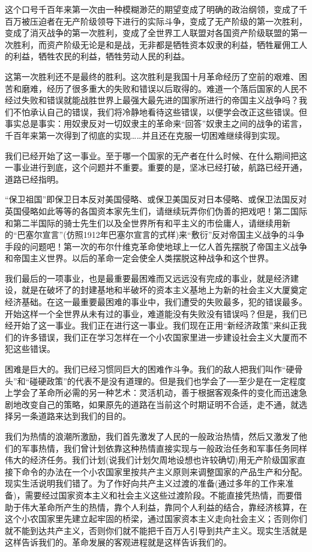 \documentclass[UTF8, 12pt, a4paper]{ctexrep}
\begin{document}
这个口号千百年来第一次由一种模糊渺茫的期望变成了明确的政治纲领，变成了千百万被压迫者在无产阶级领导下进行的实际斗争，变成了无产阶级的第一次胜利，变成了消灭战争的第一次胜利，变成了全世界工人联盟对各国资产阶级联盟的第一次胜利，而资产阶级无论是和是战，无非都是牺牲资本奴隶的利益，牺牲雇佣工人的利益，牺牲农民的利益，牺牲劳动人民的利益。

这第一次胜利还不是最终的胜利。这次胜利是我国十月革命经历了空前的艰难、困苦和磨难，经历了很多重大的失败和错误以后取得的。难道一个落后国家的人民不经过失败和错误就能战胜世界上最强大最先进的国家所进行的帝国主义战争吗？我们不怕承认自己的错误，我们将冷静地看待这些错误，以便学会改正这些错误。但事实总是事实：用奴隶反对一切奴隶主的革命来“回答”奴隶主之间的战争的诺言，千百年来第一次得到了彻底的实现……并且还在克服一切困难继续得到实现。

我们已经开始了这一事业。至于哪一个国家的无产者在什么时候、在什么期间把这一事业进行到底，这个问题并不重要。重要的是，坚冰已经打破，航路已经开通，道路已经指明。

“保卫祖国”即保卫日本反对美国侵略、或保卫美国反对日本侵略、或保卫法国反对英国侵略如此等等的各国资本家先生们，请继续玩弄你们伪善的把戏吧！第二国际和第二半国际的骑士先生们以及全世界所有和平主义的市侩庸人，请继续用新的“巴塞尔宣言”(仿照1912年巴塞尔宣言的式样)来“敷衍”反对帝国主义战争的斗争手段的问题吧！第一次的布尔什维克革命使地球上一亿人首先摆脱了帝国主义战争和帝国主义世界。以后的革命一定会使全人类摆脱这种战争和这个世界。

我们最后的一项事业，也是最重要最困难而又远远没有完成的事业，就是经济建设，就是在破坏了的封建基地和半破坏的资本主义基地上为新的社会主义大厦奠定经济基础。在这一最重要最困难的事业中，我们遭受的失败最多，犯的错误最多。开始这样一个全世界从未有过的事业，难道能没有失败没有错误吗？但是，我们已经开始了这一事业。我们正在进行这一事业。我们现在正用“新经济政策”来纠正我们的许多错误，我们正在学习怎样在一个小农国家里进一步建设社会主义大厦而不犯这些错误。

困难是巨大的。我们已经习惯同巨大的困难作斗争。我们的敌人把我们叫作“硬骨头”和“碰硬政策”的代表不是没有道理的。但是我们也学会了──至少是在一定程度上学会了革命所必需的另一种艺术：灵活机动，善于根据客观条件的变化而迅速急剧地改变自己的策略，如果原先的道路在当前这个时期证明不合适，走不通，就选择另一条道路来达到我们的目的。

我们为热情的浪潮所激励，我们首先激发了人民的一般政治热情，然后又激发了他们的军事热情，我们曾计划依靠这种热情直接实现与一般政治任务和军事任务同样伟大的经济任务。我们计划(说我们计划欠周地设想也许较确切)用无产阶级国家直接下命令的办法在一个小农国家里按共产主义原则来调整国家的产品生产和分配。现实生活说明我们错了。为了作好向共产主义过渡的准备(通过多年的工作来准备)，需要经过国家资本主义和社会主义这些过渡阶段。不能直接凭热情，而要借助于伟大革命所产生的热情，靠个人利益，靠同个人利益的结合，靠经济核算，在这个小农国家里先建立起牢固的桥梁，通过国家资本主义走向社会主义；否则你们就不能到达共产主义，否则你们就不能把千百万人引导到共产主义。现实生活就是这样告诉我们的。革命发展的客观进程就是这样告诉我们的。
\end{document}
